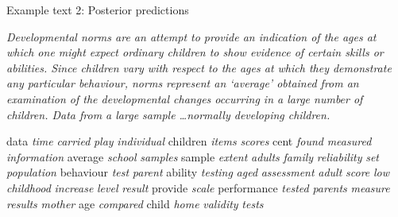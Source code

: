 \documentclass[10pt,ignorenonframetext,]{beamer}
\begin{document}
\begin{frame}{Example text 2: Posterior predictions}

	{\small\textit{
    Developmental norms are an attempt to provide an indication of the ages at which
one might expect ordinary children to show evidence of certain skills or
abilities. Since children vary with respect to the ages at which they
demonstrate any particular behaviour, norms represent an ‘average’ obtained
from an examination of the developmental changes occurring in a large number of
children. Data from a large sample \ldots normally developing children.}
    }
    \begin{center}
    {\fontsize{4.65}{35}\selectfont data}
{\fontsize{11.90}{35}\selectfont \textit{time}}
{\fontsize{4.87}{35}\selectfont \textit{carried}}
{\fontsize{6.02}{35}\selectfont \textit{play}}
{\fontsize{4.64}{35}\selectfont \textit{individual}}
{\fontsize{34.93}{35}\selectfont children}
{\fontsize{7.95}{35}\selectfont \textit{items}}
{\fontsize{14.30}{35}\selectfont \textit{scores}}
{\fontsize{22.39}{35}\selectfont cent}
{\fontsize{9.32}{35}\selectfont \textit{found}}
{\fontsize{4.83}{35}\selectfont \textit{measured}}
{\fontsize{6.39}{35}\selectfont \textit{information}}
{\fontsize{4.61}{35}\selectfont average}
{\fontsize{9.98}{35}\selectfont \textit{school}}
{\fontsize{4.52}{35}\selectfont \textit{samples}}
{\fontsize{11.76}{35}\selectfont sample}
{\fontsize{5.94}{35}\selectfont \textit{extent}}
{\fontsize{14.06}{35}\selectfont \textit{adults}}
{\fontsize{8.25}{35}\selectfont \textit{family}}
{\fontsize{4.49}{35}\selectfont \textit{reliability}}
{\fontsize{6.15}{35}\selectfont \textit{set}}
{\fontsize{7.32}{35}\selectfont \textit{population}}
{\fontsize{5.97}{35}\selectfont behaviour}
{\fontsize{32.47}{35}\selectfont \textit{test}}
{\fontsize{8.77}{35}\selectfont \textit{parent}}
{\fontsize{11.21}{35}\selectfont ability}
{\fontsize{22.31}{35}\selectfont \textit{testing}}
{\fontsize{6.09}{35}\selectfont \textit{aged}}
{\fontsize{8.50}{35}\selectfont \textit{assessment}}
{\fontsize{13.70}{35}\selectfont \textit{adult}}
{\fontsize{12.39}{35}\selectfont \textit{score}}
{\fontsize{5.75}{35}\selectfont \textit{low}}
{\fontsize{7.96}{35}\selectfont \textit{childhood}}
{\fontsize{4.16}{35}\selectfont \textit{increase}}
{\fontsize{4.75}{35}\selectfont \textit{level}}
{\fontsize{5.18}{35}\selectfont \textit{result}}
{\fontsize{7.88}{35}\selectfont provide}
{\fontsize{5.20}{35}\selectfont \textit{scale}}
{\fontsize{9.62}{35}\selectfont performance}
{\fontsize{15.81}{35}\selectfont \textit{tested}}
{\fontsize{20.77}{35}\selectfont \textit{parents}}
{\fontsize{10.22}{35}\selectfont \textit{measure}}
{\fontsize{17.92}{35}\selectfont \textit{results}}
{\fontsize{7.86}{35}\selectfont \textit{mother}}
{\fontsize{16.96}{35}\selectfont age}
{\fontsize{4.77}{35}\selectfont \textit{compared}}
{\fontsize{28.77}{35}\selectfont child}
{\fontsize{5.57}{35}\selectfont \textit{home}}
{\fontsize{9.11}{35}\selectfont \textit{validity}}
{\fontsize{29.15}{35}\selectfont \textit{tests}}
    \end{center}
\end{frame}
\end{document}
